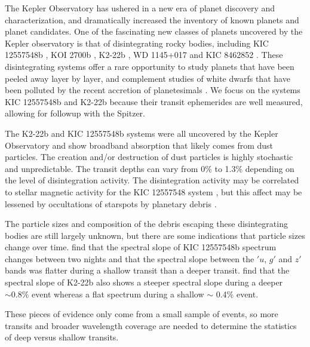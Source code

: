 \documentclass[letterpaper,12pt]{article}
\begin{document}
The Kepler Observatory has ushered in a new era of planet discovery and characterization, and dramatically increased the inventory of known planets and planet candidates.
One of the fascinating new classes of planets uncovered by the Kepler observatory is that of disintegrating rocky bodies,
including KIC 12557548b \citep{rappaport}, KOI 2700b \citep{rappaport2014KOI2700}, K2-22b \citep{sanchis-ojedak2-22}, WD 1145+017 \citep{vanderburg2015wdDisintegrating} and KIC 8462852 \citep{boyajian846}.
These disintegrating systems offer a rare opportunity to study planets that have been peeled away layer by layer, and complement studies of white dwarfs that have been polluted by the recent accretion of planetesimals \cite[e.g.][]{jura2003wdPollution}.
We focus on the systems KIC 12557548b and K2-22b because their transit ephemerides are well measured, allowing for followup with the Spitzer.

The K2-22b and KIC 12557548b systems were all uncovered by the Kepler Observatory \citep{borucki2010} and show broadband absorption that likely comes from dust particles.
The creation and/or destruction of dust particles is highly stochastic and unpredictable.
The transit depths can vary from 0\% to 1.3\% depending on the level of disintegration activity.
The disintegration activity may be correlated to stellar magnetic activity for the KIC 12557548 system \citep{kawahara2013starspots}, but this affect may be lessened by occultations of starspots by planetary debris \citep{croll2015starspots}.

The particle sizes and composition of the debris escaping these disintegrating bodies are still largely unknown, but there are some indications that particle sizes change over time.
\citet{bochinski2015evolving} find that the spectral slope of KIC 12557548b spectrum changes between two nights and that the spectral slope between the $'u$, $g'$ and $z'$ bands was flatter during a shallow transit than a deeper transit. 
\cite{sanchis-ojedak2-22} find that the spectral slope of K2-22b also shows a steeper spectral slope during a deeper $\sim 0.8\%$ event whereas a flat spectrum during a shallow $\sim$ 0.4\% event.

These pieces of evidence only come from a small sample of events, so more transits and broader wavelength coverage are needed to determine the statistics of deep versus shallow transits.

\end{document}
